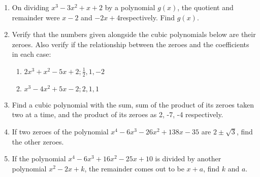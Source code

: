 \begin{enumerate}[label=\thesubsection.\arabic*, ref=\thesubsection.\theenumi,resume*]
\item On dividing $x^3-3x^2+x+2$ by a polynomial $g(x)$, the quotient and remainder were $x-2$ and $-2x+4$respectively.  Find $g(x)$.
\item Verify that the numbers given alongside the cubic polynomials below are their zeroes.  Also verify if the relationship between the zeroes and the coefficients in each case:
\begin{enumerate}
\item $2x^3+x^2-5x+2; \frac{1}{2}, 1, -2$
\item $x^3-4x^2+5x-2; 2, 1, 1$
\end{enumerate}
\item Find a cubic polynomial with the sum, sum of the product of its zeroes taken two at a time, and the product of its zeroes as 2, -7, -4 respectively.
\item If two zeroes of the polynomial $x^4-6x^3-26x^2+138x-35$ are $2\pm \sqrt{3}$, find the other zeroes.\item If the polynomial $x^4-6x^3+16x^2-25x+10$ is divided by another polynomial $x^2-2x+k$, the remainder comes out to be $x+a$, find $k$ and $a$.

\end{enumerate}
